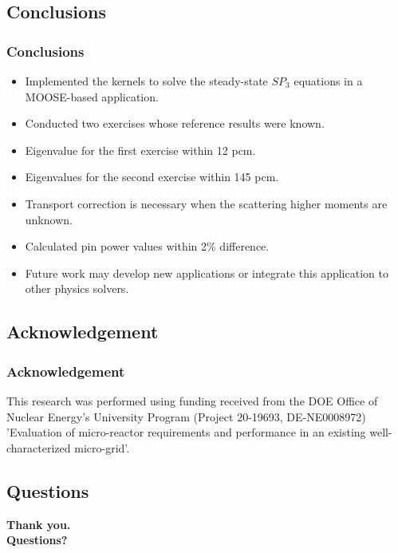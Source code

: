 \subsection{Conclusions}

\begin{frame}
\frametitle{Conclusions}

	\begin{itemize}
        \item Implemented the kernels to solve the steady-state $SP_3$ equations in a MOOSE-based application.
        \item Conducted two exercises whose reference results were known.
		\item Eigenvalue for the first exercise within 12 pcm.
		\item Eigenvalues for the second exercise within 145 pcm.
		\item Transport correction is necessary when the scattering higher moments are unknown.
		\item Calculated pin power values within 2\% difference.
        \item Future work may develop new applications or integrate this application to other physics solvers.
    \end{itemize}
\end{frame}


\subsection{Acknowledgement}

\begin{frame}
\frametitle{Acknowledgement}

This research was performed using funding received from the DOE Office of Nuclear Energy’s University Program (Project 20-19693, DE-NE0008972) ’Evaluation of micro-reactor requirements and performance in an existing well-characterized micro-grid’.

\end{frame}


\subsection{Questions}

\begin{frame}
  \begin{center}
    \Huge{\textbf{Thank you.\\ Questions?}}
  \end{center}
\end{frame}
